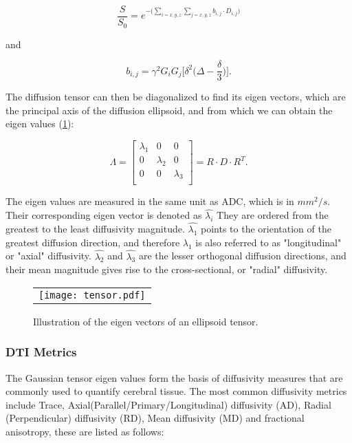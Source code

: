 \begin{equation}
\frac{S}{S_0} = e^{-\Big(\sum\limits_{i=x,y,z} \sum\limits_{j=x,y,z} b_{i,j} \cdot D_{i,j}\Big)}
\end{equation}

and 

\begin{equation}
b_{i,j} = \gamma^2 G_i G_j \Big[ \delta^2 \Big( \Delta - \frac{\delta}{3} \Big) \Big]. 
\end{equation}

The diffusion tensor can then be diagonalized to find its eigen vectors, which are the principal axis of the diffusion ellipsoid, and from which we can obtain the eigen values (\ref{fig:tensor}): 

\begin{equation}
\Lambda = 
\begin{bmatrix}
\lambda_1 	& 0 		& 0 		\\
0 			& \lambda_2	& 0 		\\
0 			& 0 		& \lambda_3 \\
\end{bmatrix}
= R \cdot D \cdot R^T.
\end{equation}

The eigen values are measured in the same unit as ADC, which is in $mm^2/s$. Their corresponding eigen vector is denoted as $\hat{\lambda_i}$ They are ordered from the greatest to the least diffusivity magnitude. $\hat{\lambda_1}$ points to the orientation of the greatest diffusion direction, and therefore $\lambda_1$ is also referred to as "longitudinal" or "axial" diffusivity. $\hat{\lambda_2}$ and $\hat{\lambda_3}$ are the lesser orthogonal diffusion directions, and their mean magnitude gives rise to the cross-sectional, or "radial" diffusivity. 

\begin{figure}[ht]
\begin{center}
\begin{tabular}{c}
\texttt{[image: tensor.pdf]}
\end{tabular}
\caption{Illustration of the eigen vectors of an ellipsoid tensor.}
\label{fig:tensor}
\end{center}
\end{figure}

\subsubsection{DTI Metrics}

The Gaussian tensor eigen values form the basis of diffusivity measures that are commonly used to quantify cerebral tissue. The most common diffusivity metrics include Trace, Axial(Parallel/Primary/Longitudinal) diffusivity (AD), Radial (Perpendicular) diffusivity (RD), Mean diffusivity (MD) and fractional anisotropy, these are listed as follows: 

